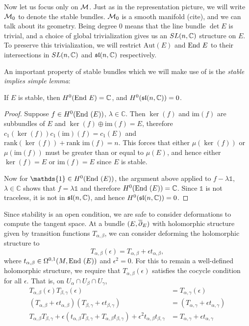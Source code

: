 	Now let us focus only on $\mathcal{M}$. Just as in the representation picture, we will write $\mathcal{M}_0$ to denote the stable bundles. $\mathcal{M}_0$ is a smooth manifold (cite), and we can talk about its geometry. Being degree 0 means that the line bundle $\det E$ is trivial, and a choice of global trivialization gives us an $SL(n,\mathbb{C})$ structure on $E$. To preserve this trivialization, we will restrict $\text{Aut}(E)$ and $\text{End } E$ to their intersections in $SL(n,\mathbb{C})$ and $\mathfrak{sl}(n,\mathbb{C})$ respectively.
	
	An important property of stable bundles which we will make use of is the \emph{stable implies simple lemma}:
	\begin{lemma}
		If $E$ is stable, then $H^0(\text{End } E) = \mathbb{C}$, and $H^0(\mathfrak{sl}(n,\mathbb{C})) = 0$.
		\label{l:stablesimple}
	\end{lemma}
	\begin{proof}
		Suppose $f\in H^0(\text{End }(E))$, $\lambda \in \mathbb{C}$. Then $\ker(f)$ and im$(f)$ are subbundles of $E$ and $\ker(f)\oplus\text{im}(f) = E$, therefore $c_1(\ker(f))c_1(\text{im})(f) = c_1(E)$ and $\text{rank}(\ker(f)) + \text{rank im}(f) = n$. This forces that either $\mu(\ker(f))$ or $\mu(\text{im}(f))$ must be greater than or equal to $\mu(E)$, and hence either $\ker(f) = E$ or $\text{im}(f)=E$ since $E$ is stable.
		
		Now for $\mathds{1}\in H^0(\End(E))$, the argument above applied to $f-\lambda \mathds{1}$, $\lambda \in \mathbb{C}$ shows that $f = \lambda \mathds{1}$ and therefore $H^0(\text{End }(E)) =\mathbb{C}$. Since $\mathds{1}$ is not traceless, it is not in $\mathfrak{sl}(n,\mathbb{C})$, and hence $H^0(\mathfrak{sl}(n,\mathbb{C})) =0$.
	\end{proof}
	Since stability is an open condition, we are safe to consider deformations to compute the tangent space. At a bundle $(E,\overline{\partial}_E)$ with holomorphic structure given by transition functions $T_{\alpha,\beta}$, we can consider deforming the holomorphic structure to 
	\begin{equation}
	T_{\alpha,\beta}(\epsilon) = T_{\alpha,\beta} + \epsilon t_{\alpha,\beta},
	\end{equation}
	where $t_{\alpha,\beta} \in \Omega^{0,1}(M,\text{End }(E))$ and $\epsilon^2=0$. For this to remain a well-defined holomorphic structure, we require that $T_{\alpha,\beta}(\epsilon)$ satisfies the cocycle condition for all $\epsilon$. That is, on $U_{\alpha}\cap U_{\beta}\cap U_{\gamma}$,
	\begin{align*}
	T_{\alpha,\beta}(\epsilon)T_{\beta,\gamma}(\epsilon) &= T_{\alpha,\gamma}(\epsilon)\\
	\left(T_{\alpha,\beta} + \epsilon t_{\alpha,\beta} \right)
	\left(T_{\beta,\gamma} + \epsilon t_{\beta,\gamma} \right) &=
	\left(T_{\alpha,\gamma} + \epsilon t_{\alpha,\gamma} \right)\\
	T_{\alpha,\beta}T_{\beta,\gamma} + \epsilon(t_{\alpha,\beta}T_{\beta,\gamma} + T_{\alpha,\beta} t_{\beta,\gamma}) + \epsilon^2 t_{\alpha,\beta}t_{\beta,\gamma} &= T_{\alpha,\gamma} + \epsilon t_{\alpha,\gamma}
	\end{align*}
